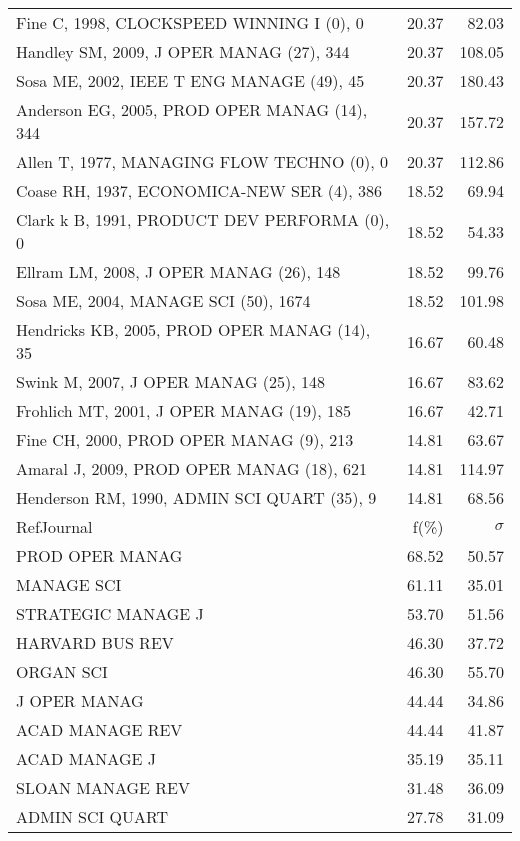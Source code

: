 \documentclass[a4paper,11pt]{report}
\begin{document}
\begin{landscape}
\begin{table}[!ht]
{\begin{tabular}{|l r r|}
Fine C, 1998, CLOCKSPEED WINNING I (0), 0 & 20.37 & 82.03\\
Handley SM, 2009, J OPER MANAG (27), 344 & 20.37 & 108.05\\
Sosa ME, 2002, IEEE T ENG MANAGE (49), 45 & 20.37 & 180.43\\
Anderson EG, 2005, PROD OPER MANAG (14), 344 & 20.37 & 157.72\\
Allen T, 1977, MANAGING FLOW TECHNO (0), 0 & 20.37 & 112.86\\
Coase RH, 1937, ECONOMICA-NEW SER (4), 386 & 18.52 & 69.94\\
Clark k B, 1991, PRODUCT DEV PERFORMA (0), 0 & 18.52 & 54.33\\
Ellram LM, 2008, J OPER MANAG (26), 148 & 18.52 & 99.76\\
Sosa ME, 2004, MANAGE SCI (50), 1674 & 18.52 & 101.98\\
Hendricks KB, 2005, PROD OPER MANAG (14), 35 & 16.67 & 60.48\\
Swink M, 2007, J OPER MANAG (25), 148 & 16.67 & 83.62\\
Frohlich MT, 2001, J OPER MANAG (19), 185 & 16.67 & 42.71\\
Fine CH, 2000, PROD OPER MANAG (9), 213 & 14.81 & 63.67\\
Amaral J, 2009, PROD OPER MANAG (18), 621 & 14.81 & 114.97\\
Henderson RM, 1990, ADMIN SCI QUART (35), 9 & 14.81 & 68.56\\
\hline
\hline
RefJournal & f(\%) & $\sigma$\\
\hline
PROD OPER MANAG & 68.52 & 50.57\\
MANAGE SCI & 61.11 & 35.01\\
STRATEGIC MANAGE J & 53.70 & 51.56\\
HARVARD BUS REV & 46.30 & 37.72\\
ORGAN SCI & 46.30 & 55.70\\
J OPER MANAG & 44.44 & 34.86\\
ACAD MANAGE REV & 44.44 & 41.87\\
ACAD MANAGE J & 35.19 & 35.11\\
SLOAN MANAGE REV & 31.48 & 36.09\\
ADMIN SCI QUART & 27.78 & 31.09\\
\hline
\end{tabular}
}
\end{table}

\end{landscape}
\end{document}
